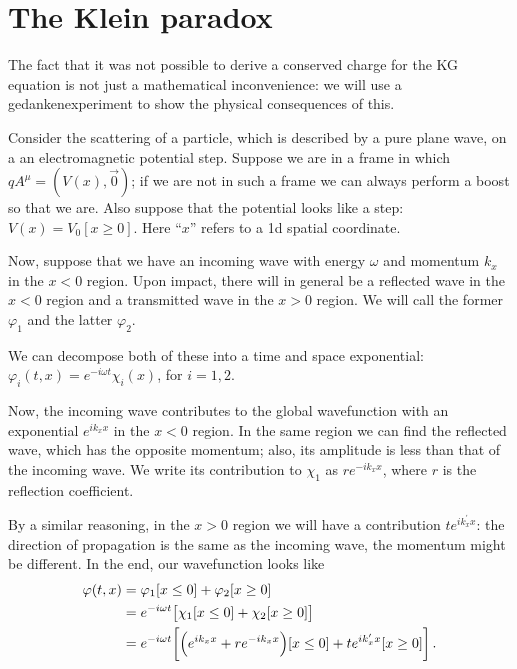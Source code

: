 \documentclass[main.tex]{subfiles}
\begin{document}
\section{The Klein paradox}


The fact that it was not possible to derive a conserved charge for the KG equation is not just a mathematical inconvenience: we will use a gedankenexperiment to show the physical consequences of this. 

Consider the scattering of a particle, which is described by a pure plane wave, on a an electromagnetic potential step.
Suppose we are in a frame in which \(qA^{\mu } = (V(x), \vec{0})\); if we are not in such a frame we can always perform a boost so that we are.
Also suppose that the potential looks like a step: \(V(x) = V_0 [x \geq 0]\). Here ``\(x\)'' refers to a 1d spatial coordinate. 

Now, suppose that we have an incoming wave with energy \(\omega \) and momentum \(k_{x}\) in the \(x<0\) region. 
Upon impact, there will in general be a reflected wave in the \(x<0\) region and a transmitted wave in the \(x>0\) region. We will call the former \(\varphi_{1}\) and the latter \(\varphi_{2}\). 

We can decompose both of these into a time and space exponential: \(\varphi_{i} (t, x) = e^{-i \omega t} \chi_{i}(x)\), for \(i = 1, 2\). 

Now, the incoming wave contributes to the global wavefunction with an exponential \(e^{ik_x x}\) in the \(x<0\) region. 
In the same region we can find the reflected wave, which has the opposite momentum; also, its amplitude is less than that of the incoming wave. We write its contribution to \(\chi_{1}\) as \(r e^{-i k_x x}\), where \(r\) is the reflection coefficient. 

By a similar reasoning, in the \(x>0\) region we will have a contribution \(t e^{i k_x^{\prime } x}\): the direction of propagation is the same as the incoming wave, the momentum might be different. In the end, our wavefunction looks like 
%
\begin{align}
\varphi (t, x) &= \varphi_1 [x\leq 0] + \varphi_2 [x \geq 0] \\
&= e^{-i \omega t} \qty[\chi_1 [x\leq 0] + \chi_2 [x \geq 0]] \\
&=
 e^{-i \omega t} \qty[ \qty(e^{i k_x x} + r e^{-i k_x x})[x\leq 0] + t e^{i k_x^{\prime }x } [x\geq 0]]
\,.
\end{align}
\end{document}
